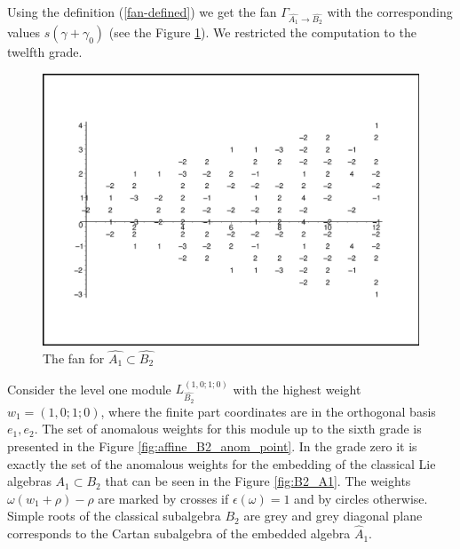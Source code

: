 \documentclass[12pt]{iopart}
\theoremstyle{definition}
\theoremstyle{definition}
\theoremstyle{definition}
\begin{document}
Using the definition (\ref{fan-defined}) we get the fan
$\Gamma_{\hat{A_1} \longrightarrow  \hat{B_2} }$
with the corresponding values $s(\gamma+\gamma_0)$ (see the Figure \ref{fig:AffineB2A1Fan}).
We restricted the computation to the twelfth grade.
\begin{figure}[h!bt]
  \centering
  \includegraphics[width=135mm]{figure10.eps}
  \caption{The fan for $\hat{A_1}\subset \hat{B_2}$}
  \label{fig:AffineB2A1Fan}
\end{figure}


Consider the level one module $L^{\left( 1,0;1;0 \right)}_{\hat{B_2}}$  with the highest weight $w_1=(1,0;1;0)$,
where the finite part coordinates are in the orthogonal basis $e_1,e_2$.
The set of anomalous weights for this module up to the sixth grade is presented in the Figure \ref{fig:affine_B2_anom_point}.
In the grade zero it is exactly the set of the anomalous weights for the embedding of
the classical Lie algebras $A_1\subset B_2$ that can be seen in the  Figure \ref{fig:B2_A1}.
The weights $\omega (w_1+\rho)-\rho$ are marked by crosses if $\epsilon(\omega)=1$ and by circles otherwise.
Simple roots of the classical subalgebra $B_2$ are grey and grey diagonal plane corresponds to the Cartan subalgebra
of the embedded algebra $\hat{A}_1$.
\end{document}
